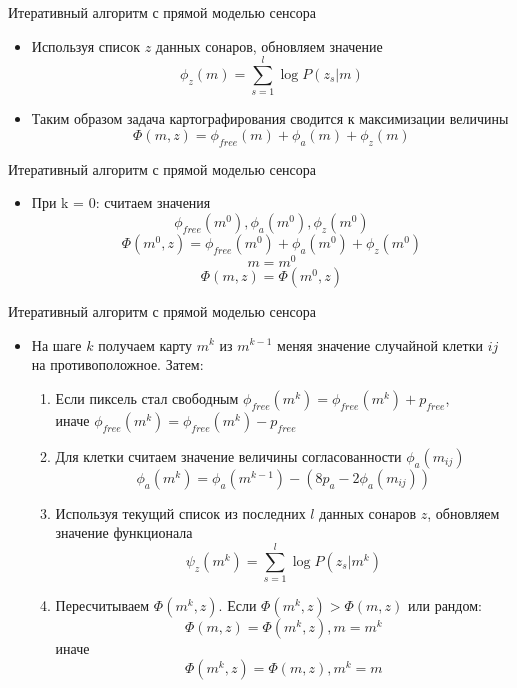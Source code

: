\documentclass[9pt]{beamer}
\begin{document}
\begin{frame}{Итеративный алгоритм с прямой моделью сенсора}
\begin{itemize}
  \item
  {
    Используя список $z$ данных сонаров, обновляем значение  $$\phi_{z}(m) = \sum_{s=1}^l \log{P(z_s|m)}$$ 
  }
  \item
  {
    Таким образом задача картографирования сводится к максимизации величины $$\Phi(m, z) = \phi_{free}(m) + \phi_a(m) + \phi_{z}(m) $$
  }
  
\end{itemize}
\end{frame}


\begin{frame}{Итеративный алгоритм с прямой моделью сенсора}
\begin{itemize}
  \item
  {
    При k = 0: считаем значения 
    $$\phi_{free}(m^{0}), \phi_a(m^{0}), \phi_{z}(m^{0})$$ 
    $$\Phi(m^{0}, z) = \phi_{free}(m^{0}) + \phi_a(m^{0}) + \phi_{z}(m^{0})$$
    $$m = m^0$$
    $$\Phi(m, z) = \Phi(m^{0}, z)$$
  }
  \end{itemize}
\end{frame}

\begin{frame}{Итеративный алгоритм с прямой моделью сенсора}
\begin{itemize}
  \item
  {
    На шаге $k$ получаем карту $m^{k}$ из $m^{k-1}$ меняя значение случайной клетки ${ij}$ на противоположное. Затем:
    \begin{enumerate}
      \item
      {
        Если пиксель стал свободным $\phi_{free}(m^{k}) = \phi_{free}(m^{k}) + p_{free}$,\\ иначе $\phi_{free}(m^{k}) = \phi_{free}(m^{k}) - p_{free}$
      }
      \item
      {
        Для клетки считаем значение величины согласованности $\phi_a(m_{ij})$
        $$\phi_a(m^k) = \phi_a(m^{k-1}) - (8p_a - 2\phi_a(m_{ij}))$$
      }
      \item
      {
        Используя текущий список из последних $l$ данных сонаров $z$,  обновляем значение функционала $$\psi_{z}(m^{k}) = \sum_{s=1}^l \log{P(z_s|m^k)}$$
      }
      \item
      {
        Пересчитываем $\Phi(m^{k}, z)$. 
        Если $\Phi(m^{k}, z) > \Phi(m, z)$ или рандом:
        $$\Phi(m, z) = \Phi(m^{k}, z), m = m^k$$
        иначе
        $$\Phi(m^{k}, z) = \Phi(m, z), m^k = m $$
      }
    \end{enumerate}
  }
  \end{itemize}
\end{frame}
\end{document}
